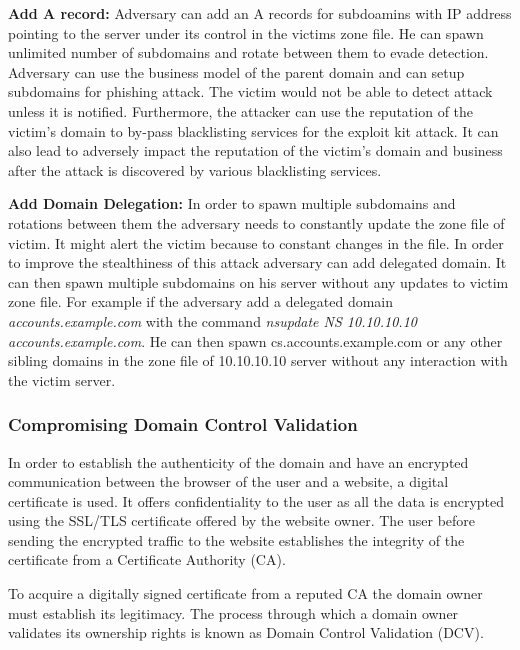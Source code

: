 \textbf{Add A record:} 
Adversary can add an A records for subdoamins with IP address pointing to the server under its control in the victims zone file. He can spawn unlimited number of subdomains and rotate between them to evade detection. Adversary can use the business model of the parent domain and can setup subdomains for phishing attack. The victim would not be able to detect attack unless it is notified. Furthermore, the attacker can use the reputation of the victim's domain to by-pass blacklisting services for the exploit kit attack. It can also lead to adversely impact the reputation of the victim's domain and business after the attack is discovered by various blacklisting services.

\textbf{Add Domain Delegation:}
In order to spawn multiple subdomains and rotations between them the adversary needs to constantly update the zone file of victim. It might alert the victim because to constant changes in the file. In order to improve the stealthiness of this attack adversary can add delegated domain. It can then spawn multiple subdomains on his server without any updates to victim zone file. For example if the adversary add a delegated domain
\textit{accounts.example.com} with the command %
\textit{nsupdate NS 10.10.10.10 accounts.example.com}. He can then spawn cs.accounts.example.com or any other sibling domains in the zone file of 10.10.10.10 server without any interaction with the victim server. 




\subsubsection{Compromising Domain Control Validation\label{sec:domainvalidation}}


In order to establish the authenticity of the domain and have an encrypted communication between the browser of the user and a website, a digital certificate is used. It offers confidentiality to the user as all the data is encrypted using the SSL/TLS certificate offered by the website owner. The user before sending the encrypted traffic to the website establishes the integrity of the certificate from a  Certificate Authority (CA). 

To acquire a digitally signed certificate from a reputed CA  the domain owner must establish its legitimacy. The process through which a  domain owner validates its ownership rights is known as Domain Control Validation (DCV). 


